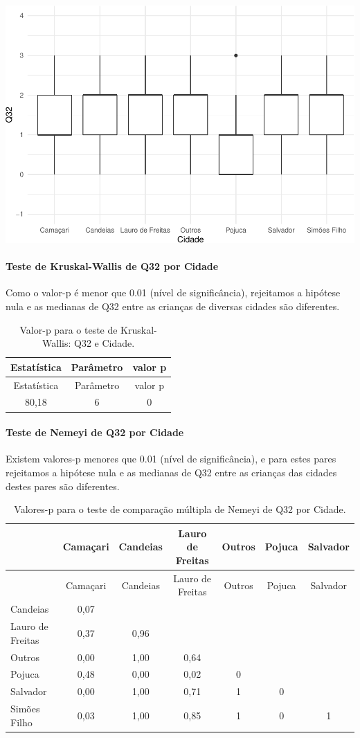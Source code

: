 \documentclass[]{article}
\let\oldparagraph\paragraph
\renewcommand{\paragraph}[1]{\oldparagraph{#1}\mbox{}}
\begin{document}
\begin{center}\includegraphics[width=0.75\linewidth]{relatorio_covid19_files/figure-latex/unnamed-chunk-1079-1} \end{center}

\hypertarget{teste-de-kruskal-wallis-de-q32-por-cidade}{%
\paragraph{Teste de Kruskal-Wallis de Q32 por Cidade}\label{teste-de-kruskal-wallis-de-q32-por-cidade}}

Como o valor-p é menor que 0.01 (nível de significância), rejeitamos a hipótese nula e as medianas de Q32 entre as crianças de diversas cidades são diferentes.

\begin{longtable}[]{@{}ccc@{}}
\caption{\label{tab:unnamed-chunk-1081}Valor-p para o teste de Kruskal-Wallis: Q32 e Cidade.}\tabularnewline
\toprule
Estatística & Parâmetro & valor p\tabularnewline
\midrule
\endfirsthead
\toprule
Estatística & Parâmetro & valor p\tabularnewline
\midrule
\endhead
80,18 & 6 & 0\tabularnewline
\bottomrule
\end{longtable}

\hypertarget{teste-de-nemeyi-de-q32-por-cidade}{%
\paragraph{Teste de Nemeyi de Q32 por Cidade}\label{teste-de-nemeyi-de-q32-por-cidade}}

Existem valores-p menores que 0.01 (nível de significância), e para estes pares rejeitamos a hipótese nula e as medianas de Q32 entre as crianças das cidades destes pares são diferentes.

\begin{longtable}[]{@{}lcccccc@{}}
\caption{\label{tab:unnamed-chunk-1083}Valores-p para o teste de comparação múltipla de Nemeyi de Q32 por Cidade.}\tabularnewline
\toprule
& Camaçari & Candeias & Lauro de Freitas & Outros & Pojuca & Salvador\tabularnewline
\midrule
\endfirsthead
\toprule
& Camaçari & Candeias & Lauro de Freitas & Outros & Pojuca & Salvador\tabularnewline
\midrule
\endhead
Candeias & 0,07 & & & & &\tabularnewline
Lauro de Freitas & 0,37 & 0,96 & & & &\tabularnewline
Outros & 0,00 & 1,00 & 0,64 & & &\tabularnewline
Pojuca & 0,48 & 0,00 & 0,02 & 0 & &\tabularnewline
Salvador & 0,00 & 1,00 & 0,71 & 1 & 0 &\tabularnewline
Simões Filho & 0,03 & 1,00 & 0,85 & 1 & 0 & 1\tabularnewline
\bottomrule
\end{longtable}
\end{document}
